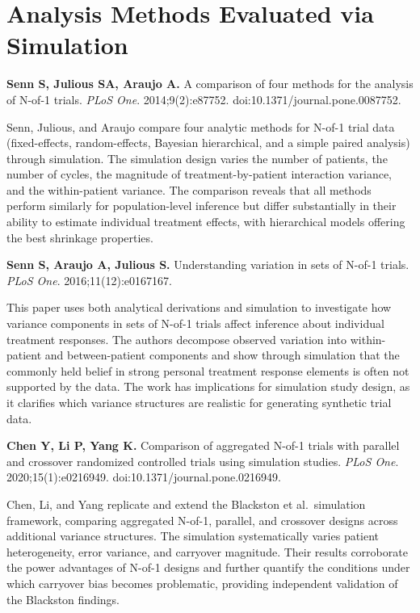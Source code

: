 \documentclass[11pt]{article}
\begin{document}
\section{Analysis Methods Evaluated via Simulation}

\textbf{Senn S, Julious SA, Araujo A.} A comparison of four
methods for the analysis of N-of-1 trials. \textit{PLoS
One}. 2014;9(2):e87752. doi:10.1371/journal.pone.0087752.

\smallskip\noindent
Senn, Julious, and Araujo compare four analytic methods
for N-of-1 trial data (fixed-effects, random-effects,
Bayesian hierarchical, and a simple paired analysis)
through simulation. The simulation design varies the number
of patients, the number of cycles, the magnitude of
treatment-by-patient interaction variance, and the
within-patient variance. The comparison reveals that all
methods perform similarly for population-level inference
but differ substantially in their ability to estimate
individual treatment effects, with hierarchical models
offering the best shrinkage properties.

\medskip
\textbf{Senn S, Araujo A, Julious S.} Understanding
variation in sets of N-of-1 trials. \textit{PLoS One}.
2016;11(12):e0167167.

\smallskip\noindent
This paper uses both analytical derivations and simulation
to investigate how variance components in sets of N-of-1
trials affect inference about individual treatment
responses. The authors decompose observed variation into
within-patient and between-patient components and show
through simulation that the commonly held belief in strong
personal treatment response elements is often not supported
by the data. The work has implications for simulation study
design, as it clarifies which variance structures are
realistic for generating synthetic trial data.

\medskip
\textbf{Chen Y, Li P, Yang K.} Comparison of aggregated
N-of-1 trials with parallel and crossover randomized
controlled trials using simulation studies. \textit{PLoS
One}. 2020;15(1):e0216949.
doi:10.1371/journal.pone.0216949.

\smallskip\noindent
Chen, Li, and Yang replicate and extend the Blackston et
al.\ simulation framework, comparing aggregated N-of-1,
parallel, and crossover designs across additional variance
structures. The simulation systematically varies patient
heterogeneity, error variance, and carryover magnitude.
Their results corroborate the power advantages of N-of-1
designs and further quantify the conditions under which
carryover bias becomes problematic, providing independent
validation of the Blackston findings.
\end{document}
